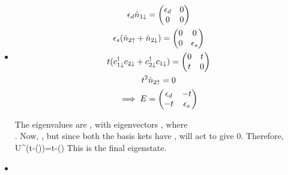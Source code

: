 \documentclass[12pt]{article}
\begin{document}
\subsection{}
\begin{itemize}
    \item {}

\begin{gather}
	\epsilon_d\hat n_{1\downarrow}=\begin{pmatrix}\epsilon_d & 0 \\ 0 & 0 \end{pmatrix}\\
	\epsilon_s(\hat n_{2\uparrow}+\hat n_{2\downarrow})=\begin{pmatrix}0 & 0 \\ 0 & \epsilon_s \end{pmatrix}\\
	t(c_{1\downarrow}^\dagger c_{2\downarrow}+c_{2\downarrow}^\dagger c_{1\downarrow})=\begin{pmatrix}0 & t \\ t & 0 \end{pmatrix}\\
	t^2\hat n_{2\uparrow}=0\\
	\implies E= \begin{pmatrix}\epsilon_d & -t \\ -t & \epsilon_s \end{pmatrix}
\end{gather}

The eigenvalues are , with eigenvectors , where \\. Now, , but since both the basis kets have , \il{\eta^\dagger} will act to give 0. Therefore,
\beq
	U^\dagger(t-(\pm{}))=t-(\pm{})
\eeq
This is the final eigenstate.

\item {}


\end{itemize}
\end{document}

